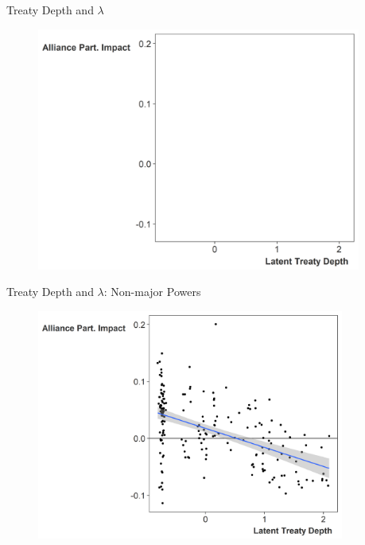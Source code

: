 \documentclass[12pt]{beamer}
\begin{document}


\begin{frame}{Treaty Depth and $\lambda$}

\begin{figure}[htbp]
	\centering
		\includegraphics[width=0.95\textwidth]{ld-lambda-blank.png}
	\label{fig:ld-lambda-blank}
\end{figure}


\end{frame}



\begin{frame}{Treaty Depth and $\lambda$: Non-major Powers}

\begin{figure}
	\centering
		\includegraphics[width=0.9\textwidth]{ld-lambda-min.png}
	\label{fig:ld-lambda-min}
\end{figure}


\end{frame}
\end{document}
